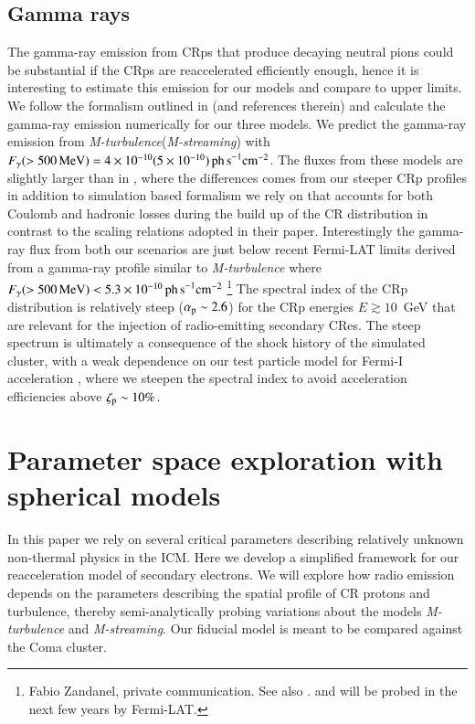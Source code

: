 \documentclass[fleqn,usenatbib,useAMS]{mnras}
\newcommand{\Mstream}{{\it M-streaming}\xspace}
\newcommand{\Mflatturb}{{\it M-turbulence}\xspace}
\begin{document}
\subsection{Gamma rays}
The gamma-ray emission from CRps that produce decaying neutral pions
could be substantial if the CRps are reaccelerated efficiently enough,
hence it is interesting to estimate this emission for our models and
compare to upper limits. We follow the formalism outlined in
  \cite{1999APh....12..169B} (and references therein) and calculate
  the gamma-ray emission numerically for our three models. We predict
the gamma-ray emission from \Mflatturb (\Mstream) with
$F_\gamma(>500\,{\mathrm{MeV}})=4\times10^{-10} (5\times10^{-10}) \mathrm{
  \,ph\, s}^{-1}\mathrm{cm}^{-2}$. The fluxes from these models are
slightly larger than in \cite{brunetti12}, where the differences comes
from our steeper CRp profiles in addition to simulation based
formalism we rely on that accounts for both Coulomb and hadronic
losses during the build up of the CR distribution in contrast to the
scaling relations adopted in their paper. Interestingly the gamma-ray
flux from both our scenarios are just below recent Fermi-LAT limits
derived from a gamma-ray profile similar to \Mflatturb where
$F_\gamma(>500\,{\mathrm{MeV}})<5.3\times10^{-10} \mathrm{ \,ph\,
  s}^{-1}\mathrm{cm}^{-2}$ \footnote{Fabio Zandanel, private
  communication. See also
  \citet{2014MNRAS.440..663Z,2014ApJ...787...18A}. and will be probed
  in the next few years by Fermi-LAT. } The spectral index of the CRp
distribution is relatively steep ($\alpha_{{\mathrm{p}}}\sim2.6$) for the
CRp energies $E \gtrsim 10$~GeV that are relevant for the injection of
radio-emitting secondary CRes. The steep spectrum is ultimately a
consequence of the shock history of the simulated cluster, with a weak
dependence on our test particle model for Fermi-I acceleration
\citep{pinzke13}, where we steepen the spectral index to avoid
acceleration efficiencies above $\zeta_{{\mathrm{p}}} \sim 10\%$.


\section{Parameter space exploration with spherical models}
\label{sect:param_comp}
In this paper we rely on several critical parameters describing
relatively unknown non-thermal physics in the ICM. Here we develop a
simplified framework for our reacceleration model of secondary
electrons. We will explore how radio emission depends on the
parameters describing the spatial profile of CR protons and
turbulence, thereby semi-analytically probing variations about the
models \Mflatturb and \Mstream. Our fiducial model is meant to be
compared against the Coma cluster.
\end{document}

